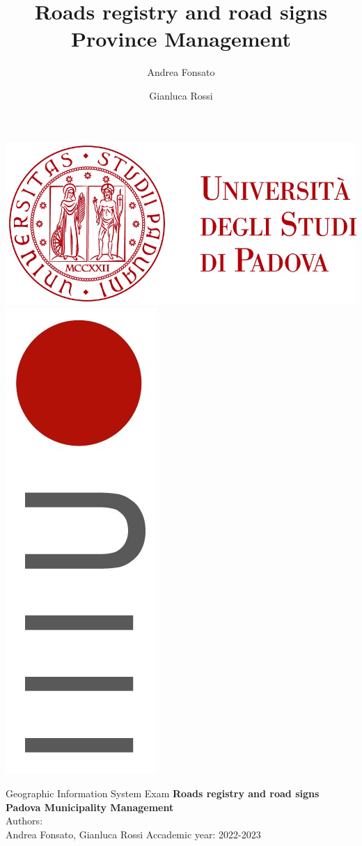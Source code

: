 

\begin{flushleft}
\includegraphics[width=0.3\columnwidth]{images/unipd.jpg}
\hspace{\fill}
\includegraphics[width=0.05\columnwidth]{images/dei.jpg}
\hspace{0.01 cm}
\begin{minipage}[b][1,8 cm][c]{0.3\columnwidth}
\textsf{{\color{Sepia}{DIPARTIMENTO\\DI INGEGNERIA\\DELL’INFORMAZIONE}}}
\end{minipage}
\end{flushleft}

\vfill
\begin{center}

\title{Roads registry and road signs Province Management}
\author{Andrea Fonsato}
\author{Gianluca Rossi}

Geographic Information System Exam
\vfill
\textbf{{\LARGE Roads registry and road signs Padova Municipality Management}}
\vspace{5cm} \\
Authors:\\
Andrea Fonsato, Gianluca Rossi
\vfill
Accademic year: 2022-2023
\\
\vfill

\end{center}